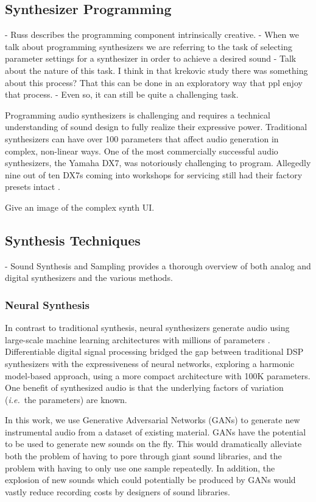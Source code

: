\subsection{Synthesizer Programming}
- Russ describes the programming component intrinsically creative.
- When we talk about programming synthesizers we are referring to the task of selecting parameter settings for a synthesizer in order to achieve a desired sound
- Talk about the nature of this task. I think in that krekovic study there was something about this process? That this can be done in an exploratory way that ppl enjoy that process.
- Even so, it can still be quite a challenging task.

Programming audio synthesizers is challenging and requires a technical understanding of sound design to fully realize their expressive power. Traditional synthesizers can have over 100 parameters that affect audio generation in complex, non-linear ways. One of the most commercially successful audio synthesizers, the Yamaha DX7, was notoriously challenging to program. Allegedly nine out of ten DX7s coming into workshops for servicing still had their factory presets intact \cite{seago2004critical}.

Give an image of the complex synth UI.

\subsection{Synthesis Techniques}
- Sound Synthesis and Sampling provides a thorough overview of both analog and digital synthesizers and the various methods. \cite{russ2012sound}

\subsubsection{Neural Synthesis}
In contrast to traditional synthesis, neural synthesizers generate audio using large-scale machine learning architectures with millions of parameters \cite{engel2017neural}. Differentiable digital signal processing \cite{engel2020ddsp} bridged the gap between traditional DSP synthesizers with the expressiveness of neural networks, exploring a harmonic model-based approach, using a more compact architecture with 100K parameters.
One benefit of synthesized audio is that the underlying factors of variation ({\em i.e.}~the parameters) are known.

In this work, we use Generative Adversarial Networks (GANs) \cite{goodfellow2014generative} to generate new instrumental audio from a dataset of existing material. GANs have the potential to be used to generate new sounds on the fly. This would dramatically alleviate both the problem of having to pore through giant sound libraries, and the problem with having to only use one sample repeatedly. In addition, the explosion of new sounds which could potentially be produced by GANs would vastly reduce recording costs by designers of sound libraries.

